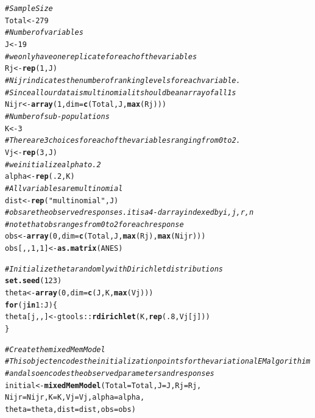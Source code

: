 \documentclass{article}\usepackage[]{graphicx}\usepackage[]{color}
\makeatletter
\newcommand{\hlnum}[1]{\textcolor[rgb]{0.686,0.059,0.569}{#1}}%
\newcommand{\hlstr}[1]{\textcolor[rgb]{0.192,0.494,0.8}{#1}}%
\newcommand{\hlcom}[1]{\textcolor[rgb]{0.678,0.584,0.686}{\textit{#1}}}%
\newcommand{\hlopt}[1]{\textcolor[rgb]{0,0,0}{#1}}%
\newcommand{\hlstd}[1]{\textcolor[rgb]{0.345,0.345,0.345}{#1}}%
\newcommand{\hlkwa}[1]{\textcolor[rgb]{0.161,0.373,0.58}{\textbf{#1}}}%
\newcommand{\hlkwb}[1]{\textcolor[rgb]{0.69,0.353,0.396}{#1}}%
\newcommand{\hlkwc}[1]{\textcolor[rgb]{0.333,0.667,0.333}{#1}}%
\newcommand{\hlkwd}[1]{\textcolor[rgb]{0.737,0.353,0.396}{\textbf{#1}}}%
\newenvironment{kframe}{%
 \def\at@end@of@kframe{}%
 \ifinner\ifhmode%
  \def\at@end@of@kframe{\end{minipage}}%
  \begin{minipage}{\columnwidth}%
 \fi\fi%
 \def\FrameCommand##1{\hskip\@totalleftmargin \hskip-\fboxsep
 \colorbox{shadecolor}{##1}\hskip-\fboxsep
     \hskip-\linewidth \hskip-\@totalleftmargin \hskip\columnwidth}%
 \MakeFramed {\advance\hsize-\width
   \@totalleftmargin\z@ \linewidth\hsize
   \@setminipage}}%
 {\par\unskip\endMakeFramed%
 \at@end@of@kframe}
\newenvironment{knitrout}{}{} %
\renewenvironment{knitrout}{\begin{singlespace}}{\end{singlespace}}
\makeatother
\begin{document}
\begin{knitrout}
\color{fgcolor}\begin{kframe}
\begin{alltt}
\hlcom{# Sample Size}
\hlstd{Total} \hlkwb{<-} \hlnum{279}
\hlcom{# Number of variables}
\hlstd{J} \hlkwb{<-} \hlnum{19}
\hlcom{# we only have one replicate for each of the variables}
\hlstd{Rj} \hlkwb{<-} \hlkwd{rep}\hlstd{(}\hlnum{1}\hlstd{, J)}
\hlcom{# Nijr indicates the number of ranking levels for each variable.}
\hlcom{# Since all our data is multinomial it should be an array of all 1s}
\hlstd{Nijr} \hlkwb{<-} \hlkwd{array}\hlstd{(}\hlnum{1}\hlstd{,} \hlkwc{dim} \hlstd{=} \hlkwd{c}\hlstd{(Total, J,} \hlkwd{max}\hlstd{(Rj)))}
\hlcom{# Number of sub-populations}
\hlstd{K} \hlkwb{<-} \hlnum{3}
\hlcom{# There are 3 choices for each of the variables ranging from 0 to 2.}
\hlstd{Vj} \hlkwb{<-} \hlkwd{rep}\hlstd{(}\hlnum{3}\hlstd{, J)}
\hlcom{# we initialize alpha to .2}
\hlstd{alpha} \hlkwb{<-} \hlkwd{rep}\hlstd{(}\hlnum{.2}\hlstd{, K)}
\hlcom{# All variables are multinomial}
\hlstd{dist} \hlkwb{<-} \hlkwd{rep}\hlstd{(}\hlstr{"multinomial"}\hlstd{, J)}
\hlcom{# obs are the observed responses. it is a 4-d array indexed by i,j,r,n}
\hlcom{# note that obs ranges from 0 to 2 for each response}
\hlstd{obs} \hlkwb{<-} \hlkwd{array}\hlstd{(}\hlnum{0}\hlstd{,} \hlkwc{dim} \hlstd{=} \hlkwd{c}\hlstd{(Total, J,} \hlkwd{max}\hlstd{(Rj),} \hlkwd{max}\hlstd{(Nijr)))}
\hlstd{obs[, ,} \hlnum{1}\hlstd{,} \hlnum{1}\hlstd{]} \hlkwb{<-} \hlkwd{as.matrix}\hlstd{(ANES)}

\hlcom{# Initialize theta randomly with Dirichlet distributions}
\hlkwd{set.seed}\hlstd{(}\hlnum{123}\hlstd{)}
\hlstd{theta} \hlkwb{<-} \hlkwd{array}\hlstd{(}\hlnum{0}\hlstd{,} \hlkwc{dim} \hlstd{=} \hlkwd{c}\hlstd{(J, K,} \hlkwd{max}\hlstd{(Vj)))}
\hlkwa{for} \hlstd{(j} \hlkwa{in} \hlnum{1}\hlopt{:}\hlstd{J) \{}
    \hlstd{theta[j, , ]} \hlkwb{<-} \hlstd{gtools}\hlopt{::}\hlkwd{rdirichlet}\hlstd{(K,} \hlkwd{rep}\hlstd{(}\hlnum{.8}\hlstd{, Vj[j]))}
\hlstd{\}}

\hlcom{# Create the mixedMemModel}
\hlcom{# This object encodes the initialization points for the variational EM algorithim}
\hlcom{# and also encodes the observed parameters and responses}
\hlstd{initial} \hlkwb{<-} \hlkwd{mixedMemModel}\hlstd{(}\hlkwc{Total} \hlstd{= Total,} \hlkwc{J} \hlstd{= J,} \hlkwc{Rj} \hlstd{= Rj,}
                         \hlkwc{Nijr} \hlstd{= Nijr,} \hlkwc{K} \hlstd{= K,} \hlkwc{Vj} \hlstd{= Vj,} \hlkwc{alpha} \hlstd{= alpha,}
                         \hlkwc{theta} \hlstd{= theta,} \hlkwc{dist} \hlstd{= dist,} \hlkwc{obs} \hlstd{= obs)}
\end{alltt}
\end{kframe}
\end{knitrout}
\end{document}
